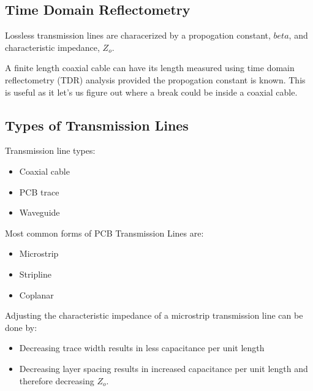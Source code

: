 \documentclass[main.tex]{subfiles}
\begin{document}
\subsection{Time Domain Reflectometry}
Lossless transmission lines are characerized by a propogation constant, $beta$, and characteristic impedance, $Z_o$. 

A finite length coaxial cable can have its length measured using time domain reflectometry (TDR) analysis provided the propogation constant is known. This is useful as it let's us figure out where a break could be inside a coaxial cable. 


\subsection{Types of Transmission Lines}
Transmission line types:
\begin{itemize}
    \item Coaxial cable
    \item PCB trace
    \item Waveguide
\end{itemize}
Most common forms of PCB Transmission Lines are:
\begin{itemize}
    \item Microstrip
    \item Stripline
    \item Coplanar
\end{itemize}
Adjusting the characteristic impedance of a microstrip transmission line can be done by:
\begin{itemize}
    \item Decreasing trace width results in less capacitance per unit length 
    \item Decreasing layer spacing results in increased capacitance per unit length and therefore decreasing $Z_o$.
\end{itemize}
\end{document}
